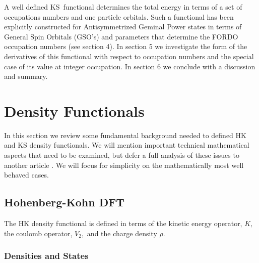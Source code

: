 \documentclass[aps,preprint]{revtex4}%
\begin{document}
A well defined KS\ functional determines the total energy in terms of a set of
occupations numbers and one particle orbitals. Such a functional has been
explicitly constructed \cite{Weiner&Ortiz2005} for Antisymmetrized Geminal
Power states in terms of General Spin Orbitals (GSO's) and parameters that
determine the FORDO occupation numbers (see section 4). In section 5 we
investigate the form of the derivatives of this functional with respect to
occupation numbers and the special case of its value at integer occupation. In
section 6 we conclude with a discussion and summary.

\section{Density Functionals \label{Standard}}

In this section we review some fundamental background needed to defined HK and
KS density functionals. We will mention important technical mathematical
aspects that need to be examined, but defer a full analysis of these issues to
another article \cite{weiner05}. We will focus for simplicity on the
mathematically most well behaved cases.

\subsection{Hohenberg-Kohn DFT}

The HK density functional is defined in terms of the kinetic energy operator,
$K,$ the coulomb operator, $V_{2},$ and the charge density $\rho$.

\subsubsection{Densities and States}
\end{document}
